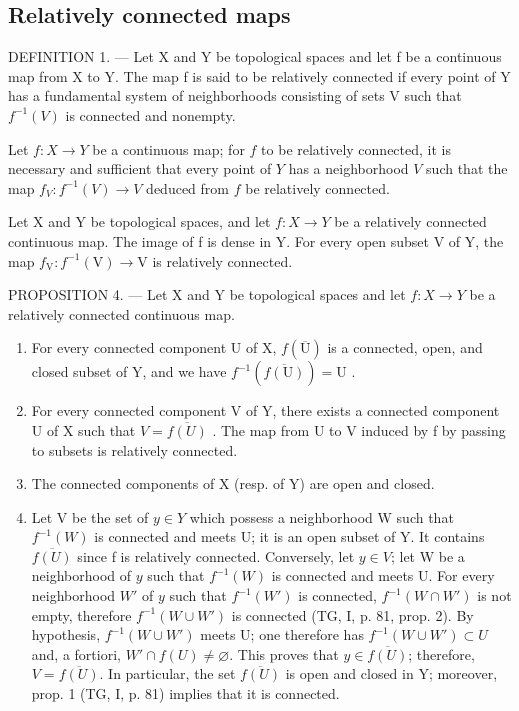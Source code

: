 \subsection{Relatively connected maps}

DEFINITION 1. --- Let X and Y be topological spaces and let f be a continuous map from X to Y. The map f is said to be relatively connected if every point of Y has a fundamental system of neighborhoods consisting of sets V such that \(f^{-1}(V)\) is connected and nonempty.

Let \(f \colon X \to Y\) be a continuous map; for \(f\) to be relatively connected, it is necessary and sufficient that every point of \(Y\) has a neighborhood \(V\) such that the map \(f_V \colon f^{-1}(V) \to V\) deduced from \(f\) be relatively connected.

Let X and Y be topological spaces, and let \(f: X \to Y\) be a relatively connected continuous map. The image of f is dense in Y. For every open subset V of Y, the map \(f_{\mathrm{V}}: f^{-1}(\mathrm{V}) \to \mathrm{V}\) is relatively connected.

PROPOSITION 4. --- Let X and Y be topological spaces and let \(f: X \to Y\) be a relatively connected continuous map.

\begin{enumerate}
\def\labelenumi{\alph{enumi})}
\item
  For every connected component U of X, \(f(\overline{\mathrm{U}})\) is a connected, open, and closed subset of Y, and we have \(f^{-1}(\overline{f(\mathrm{U})}) = \mathrm{U}\) .
\item
  For every connected component V of Y, there exists a connected component U of X such that \(V = \overline{f(U)}\) . The map from U to V induced by f by passing to subsets is relatively connected.
\item
  The connected components of X (resp. of Y) are open and closed.
\item
Let V be the set of \(y \in Y\) which possess a neighborhood W such that \(f^{-1}(W)\) is connected and meets U; it is an open subset of Y. It contains \(\overline{f(U)}\) since f is relatively connected. Conversely, let \(y \in V\); let W be a neighborhood of \(y\) such that \(f^{-1}(W)\) is connected and meets U. For every neighborhood \(W'\) of \(y\) such that \(f^{-1}(W')\) is connected, \(f^{-1}(W \cap W')\) is not empty, therefore \(f^{-1}(W \cup W')\) is connected (TG, I, p. 81, prop. 2). By hypothesis, \(f^{-1}(W \cup W')\) meets U; one therefore has \(f^{-1}(W \cup W') \subset U\) and, a fortiori, \(W' \cap f(U) \neq \varnothing\). This proves that \(y \in \overline{f(U)}\); therefore, \(V = \overline{f(U)}\). In particular, the set \(\overline{f(U)}\) is open and closed in Y; moreover, prop. 1 (TG, I, p. 81) implies that it is connected.
\end{enumerate}

